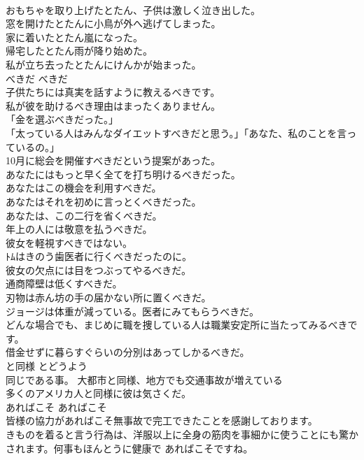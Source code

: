 \documentclass[8pt]{extreport}
\begin{document}
\begin{CJK}{UTF8}{min}
\\	おもちゃを取り上げたとたん、子供は激しく泣き出した。  
\\	窓を開けたとたんに小鳥が外へ逃げてしまった。  
\\	家に着いたとたん嵐になった。   
\\	帰宅したとたん雨が降り始めた。   
\\	私が立ち去ったとたんにけんかが始まった。   
\\	べきだ	べきだ	
\\	子供たちには真実を話すように教えるべきです。  
\\	私が彼を助けるべき理由はまったくありません。  
\\	「金を選ぶべきだった。」   
\\	「太っている人はみんなダイエットすべきだと思う。」「あなた、私のことを言っているの。」  
\\	10月に総会を開催すべきだという提案があった。  
\\	あなたにはもっと早く全てを打ち明けるべきだった。  
\\	あなたはこの機会を利用すべきだ。  
\\	あなたはそれを初めに言っとくべきだった。  
\\	あなたは、この二行を省くべきだ。  
\\	年上の人には敬意を払うべきだ。   
\\	彼女を軽視すべきではない。  
\\	ﾄﾑはきのう歯医者に行くべきだったのに。   
\\	彼女の欠点には目をつぶってやるべきだ。  
\\	通商障壁は低くすべきだ。  
\\	刃物は赤ん坊の手の届かない所に置くべきだ。  
\\	ジョージは体重が減っている。医者にみてもらうべきだ。  
\\	どんな場合でも、まじめに職を捜している人は職業安定所に当たってみるべきです。  
\\	借金せずに暮らすぐらいの分別はあってしかるべきだ。  
\\	と同様	とどうよう	
\\	同じである事。	大都市と同様、地方でも交通事故が増えている	
\\	多くのアメリカ人と同様に彼は気さくだ。  
\\	あればこそ	あればこそ	
\\	皆様の協力があればこそ無事故で完工できたことを感謝しております。  
\\	きものを着ると言う行為は、洋服以上に全身の筋肉を事細かに使うことにも驚かされます。何事もほんとうに健康で あればこそですね。  

\end{CJK}
\end{document}
